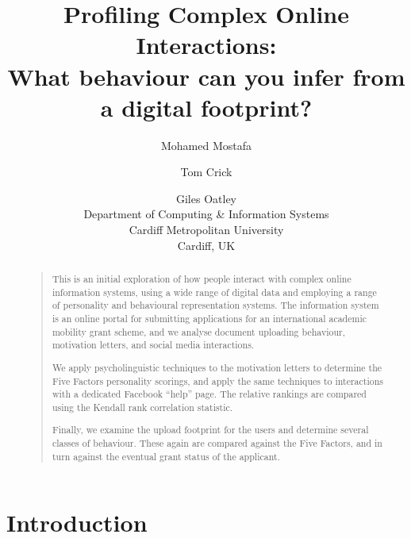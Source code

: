 \documentclass[letterpaper]{article}
\begin{document}
%
\title{Profiling Complex Online Interactions:\\What behaviour can you infer from a digital footprint?}
\author{Mohamed Mostafa \and Tom Crick \and Giles Oatley\\
Department of Computing \& Information Systems\\
Cardiff Metropolitan University\\
Cardiff, UK
}
\maketitle
\begin{abstract}
\begin{quote}
This is an initial exploration of how people interact with complex
online information systems, using a wide range of digital data and
employing a range of personality and behavioural representation
systems. The information system is an online portal for submitting
applications for an international academic mobility grant scheme, and
we analyse document uploading behaviour, motivation letters, and
social media interactions.

We apply psycholinguistic techniques to the motivation letters to
determine the Five Factors personality scorings, and apply the same
techniques to interactions with a dedicated Facebook ``help''
page. The relative rankings are compared using the Kendall rank
correlation statistic.

Finally, we examine the upload footprint for the users and determine
several classes of behaviour. These again are compared against the
Five Factors, and in turn against the eventual grant status of the
applicant.
\end{quote}
\end{abstract}


\section{Introduction}




\end{document}

